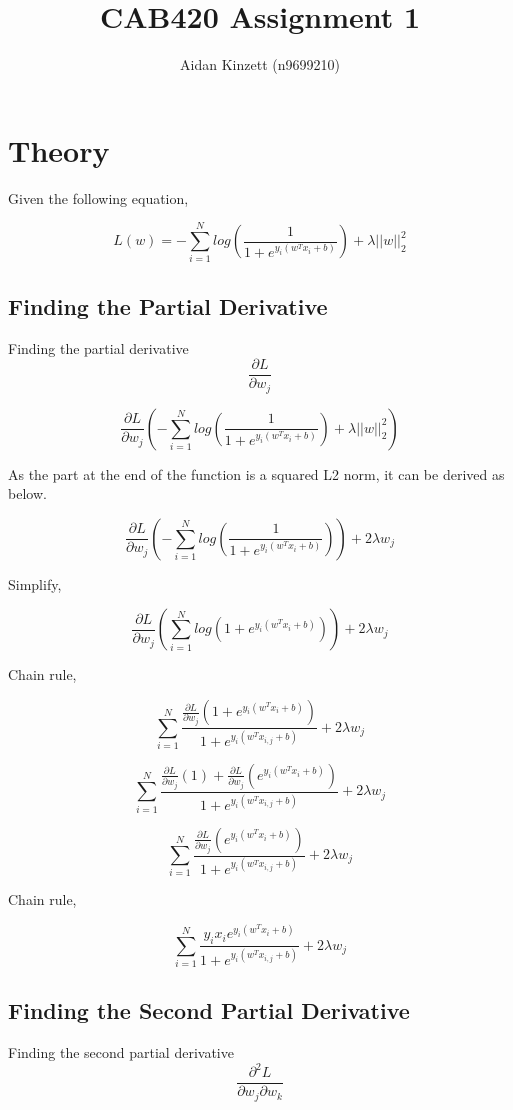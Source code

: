 \documentclass[]{scrreprt}   %
\begin{document}
	
\title{CAB420 Assignment 1}   %
\author{Aidan Kinzett (n9699210)}         %
\maketitle
\chapter{Theory}

Given the following equation,

$$L(w)=-\sum_{i=1}^{N}log(\frac{1}{1+e^{y_i(w^Tx_i+b)}})+\lambda||w||_2^2$$

\section{Finding the Partial Derivative}
Finding the partial derivative $$\frac{\partial L}{\partial w_j}$$

$$\frac{\partial L}{\partial w_j}(-\sum_{i=1}^{N}log(\frac{1}{1+e^{y_i(w^Tx_i+b)}})+\lambda||w||_2^2)$$

As the part at the end of the function is a squared L2 norm, it can be derived as below.

$$\frac{\partial L}{\partial w_j}(-\sum_{i=1}^{N}log(\frac{1}{1+e^{y_i(w^Tx_i+b)}}))+2\lambda w_j$$

Simplify,

$$\frac{\partial L}{\partial w_j}(\sum_{i=1}^{N}log(1+e^{y_i(w^Tx_i+b)}))+2\lambda w_j$$

Chain rule,

$$\sum_{i=1}^{N}\frac{\frac{\partial L}{\partial w_j}(1+e^{y_i(w^Tx_i+b)})}{1+e^{y_i(w^Tx_{i,j}+b)}}+2\lambda w_j$$

$$\sum_{i=1}^{N}\frac{\frac{\partial L}{\partial w_j}(1)+\frac{\partial L}{\partial w_j}(e^{y_i(w^Tx_i+b)})}{1+e^{y_i(w^Tx_{i,j}+b)}}+2\lambda w_j$$

$$\sum_{i=1}^{N}\frac{\frac{\partial L}{\partial w_j}(e^{y_i(w^Tx_i+b)})}{1+e^{y_i(w^Tx_{i,j}+b)}}+2\lambda w_j$$

Chain rule,

$$\sum_{i=1}^{N}\frac{y_ix_ie^{y_i(w^Tx_i+b)}}{1+e^{y_i(w^Tx_{i,j}+b)}}+2\lambda w_j$$

\section{Finding the Second Partial Derivative}
Finding the second partial derivative $$\frac{\partial^2 L}{\partial w_j\partial w_k}$$
\end{document}
